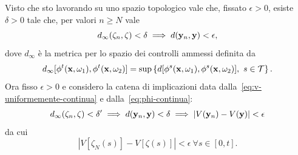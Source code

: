 \begin{steps}
    Visto che sto lavorando su uno spazio topologico vale che, fissato $\epsilon > 0$, esiste $\delta > 0$ tale che,
    per valori $n \geq N$ vale
    \begin{equation}
        d_\infty(\zeta_n, \zeta) < \delta \implies d(\mathbf{y}_n, \mathbf{y}) < \epsilon,
        \label{eq:phi-continua}
    \end{equation}
    dove $d_\infty$ è la metrica per lo spazio dei controlli ammessi definita da
    \begin{equation*}
        d_{\infty}[\phi^t(\b x, \omega_1), \phi^t(\b x, \omega_2)] =
        \sup \left\{ d[\phi^s(\b x, \omega_1), \phi^s(\b x, \omega_2)],\ s \in \mathcal T  \right\}.
    \end{equation*}
    Ora fisso $\epsilon > 0$ e considero la catena di implicazioni data
    dalla~\eqref{eq:v-uniformemente-continua} e dalla~\eqref{eq:phi-continua}:
    \begin{equation}
        d_\infty(\zeta_n, \zeta) < \delta' \implies d(\mathbf{y}_n, \mathbf{y}) < \delta \implies |V(\mathbf{y}_n) - V(\mathbf{y})| < \epsilon
        \label{eq:implication-chain}
    \end{equation}
    da cui
    \begin{equation}
        \left| V[\zeta_N(s)] - V[\zeta(s)] \right| < \epsilon\ \forall s \in [0, t].
        \label{eq:lesser-forall-t}
    \end{equation}


\end{steps}
